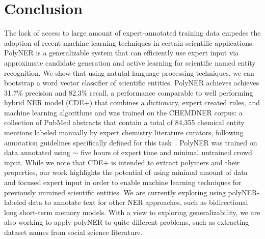 \section{Conclusion}
\label{sect:apner_conclusion}
The lack of access to large amount of expert-annotated training data empedes the adoption of recent machine learning techniques in certain scientific applications.
PolyNER is a generalizable system that can efficiently use expert input via approximate candidate generation and active learning for scientific named entity recognition.
We show that using natutal language processing techniques, we can bootstrap a word vector classifier of scientific entities.
PolyNER achieves achieves 31.7\% precision and 82.3\% recall, a performance comparable to well performing
hybrid NER model (CDE+) that combines a dictionary, expert created
rules, and machine learning algorithms and was trained on the CHEMDNER corpus:
a collection of  PubMed abstracts that contain a total of 84,355 chemical entity mentions labeled manually by expert chemistry literature curators, following annotation guidelines specifically defined for this task~\cite{krallinger2015chemdner}. 
PolyNER was trained on data annotated using $\sim$ five hours of expert time and minimal untrained crowd input.
While we note that CDE+ is intended to extract polymers and their properties, our work highlights the potential of using minimal amount of data and focused expert input in order to enable machine learning techniques for previously unmined scientific entities. 
We are currently exploring using polyNER-labeled data to annotate text for other NER approaches,
such as bidirectional long short-term memory models.
With a view to exploring generalizability, we are also working to apply polyNER
to quite different problems, such as extracting dataset names from social science
literature. 